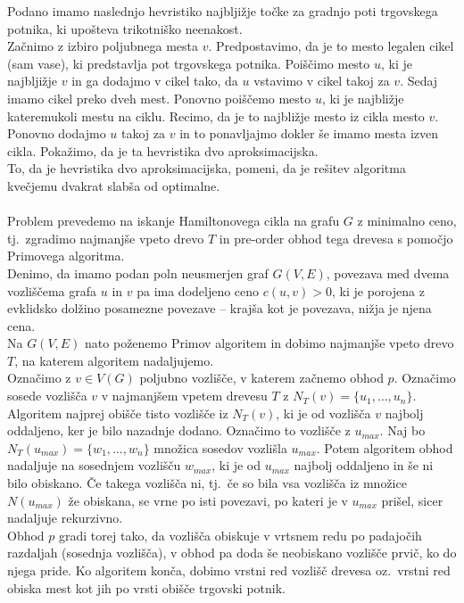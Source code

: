 \documentclass[a4paper,11pt]{article}
\begin{document}
Podano imamo naslednjo hevristiko najbljižje točke za gradnjo poti
trgovskega potnika, ki upošteva trikotniško neenakost.
\\
Začnimo z izbiro poljubnega mesta $v$. Predpostavimo, da je to mesto
legalen cikel (sam vase), ki predstavlja pot trgovskega potnika. 
Poiščimo mesto $u$, ki je najbljižje $v$ in ga dodajmo v cikel tako, da $u$ vstavimo v cikel takoj za $v$. 
Sedaj imamo cikel preko dveh mest.
Ponovno poiščemo mesto $u$, ki je najbližje kateremukoli mestu na ciklu. 
Recimo, da je to najbližje mesto iz cikla mesto $v$. Ponovno dodajmo $u$ takoj za $v$ in to ponavljajmo dokler še imamo mesta izven cikla.
Pokažimo, da je ta hevristika dvo aproksimacijska.
\\
To, da je hevristika dvo aproksimacijska, pomeni, da je rešitev algoritma kvečjemu dvakrat slabša od optimalne.
\\
\\
Problem prevedemo na iskanje Hamiltonovega cikla na grafu $G$ z minimalno ceno, tj.~zgradimo najmanjše vpeto drevo $T$ in pre-order obhod tega drevesa s pomočjo Primovega algoritma.
\\
Denimo, da imamo podan poln neusmerjen graf $G(V, E)$, povezava med dvema vozliščema grafa $u$ in $v$ pa ima dodeljeno ceno $c(u, v) > 0$, ki je porojena z evklidsko dolžino posamezne povezave -- krajša kot je povezava, nižja je njena cena.
\\
Na $G(V, E)$ nato poženemo Primov algoritem in dobimo najmanjše vpeto drevo $T$, na katerem algoritem nadaljujemo.
\\
Označimo z $v \in V(G)$ poljubno vozlišče, v katerem začnemo obhod $p$. 
Označimo sosede vozlišča $v$ v najmanjšem vpetem drevesu $T$ z $N_T (v) = \{u_1, \ldots, u_n \}$. 
Algoritem najprej obišče tisto vozlišče iz $N_T(v)$, ki je od vozlišča $v$ najbolj oddaljeno, ker je bilo nazadnje dodano. Označimo to vozlišče z $u_{max}$.
Naj bo $N_T(u_{max}) = \{ w_1, \ldots, w_n\}$ množica sosedov vozlišla $u_{max}$. 
Potem algoritem obhod nadaljuje na sosednjem vozlišču $w_{max}$, ki je od $u_{max}$ najbolj oddaljeno in še ni bilo obiskano. 
Če takega vozlišča ni, tj.~če so bila vsa vozlišča iz množice $N(u_{max})$ že obiskana, se vrne po isti povezavi, po kateri je v $u_{max}$ prišel, sicer nadaljuje rekurzivno. 
\\
Obhod $p$ gradi torej tako, da vozlišča obiskuje v vrtsnem redu po padajočih razdaljah (sosednja vozlišča), v obhod pa doda še neobiskano vozlišče prvič, ko do njega pride.
Ko algoritem konča, dobimo vrstni red vozlišč drevesa oz.~vrstni red obiska mest kot jih po vrsti obišče trgovski potnik.
\end{document}
